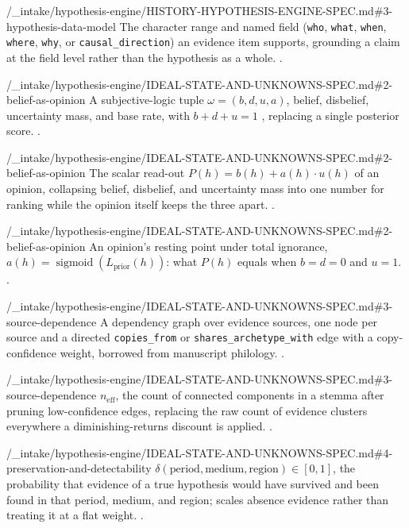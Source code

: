 %
  {\bktrepo/_intake/hypothesis-engine/HISTORY-HYPOTHESIS-ENGINE-SPEC.md\#3-hypothesis-data-model}%
  {The character range and named field (\texttt{who}, \texttt{what},
   \texttt{when}, \texttt{where}, \texttt{why}, or \texttt{causal\_direction})
   an evidence item supports, grounding a claim at the field level rather
   than the hypothesis as a whole. .}

%
  {\bktrepo/_intake/hypothesis-engine/IDEAL-STATE-AND-UNKNOWNS-SPEC.md\#2-belief-as-opinion}%
  {A subjective-logic tuple $\omega = (b, d, u, a)$, belief, disbelief,
   uncertainty mass, and base rate, with $b + d + u = 1$
   \autocite{josang2016subjective}, replacing a single posterior score.
   .}

%
  {\bktrepo/_intake/hypothesis-engine/IDEAL-STATE-AND-UNKNOWNS-SPEC.md\#2-belief-as-opinion}%
  {The scalar read-out $P(h) = b(h) + a(h) \cdot u(h)$ of an opinion,
   collapsing belief, disbelief, and uncertainty mass into one number for
   ranking while the opinion itself keeps the three apart.
   .}

%
  {\bktrepo/_intake/hypothesis-engine/IDEAL-STATE-AND-UNKNOWNS-SPEC.md\#2-belief-as-opinion}%
  {An opinion's resting point under total ignorance, $a(h) =
   \operatorname{sigmoid}(L_{\mathrm{prior}}(h))$: what $P(h)$ equals when
   $b = d = 0$ and $u = 1$. .}

%
  {\bktrepo/_intake/hypothesis-engine/IDEAL-STATE-AND-UNKNOWNS-SPEC.md\#3-source-dependence}%
  {A dependency graph over evidence sources, one node per source and a
   directed \texttt{copies\_from} or \texttt{shares\_archetype\_with} edge
   with a copy-confidence weight, borrowed from manuscript philology.
   .}

%
  {\bktrepo/_intake/hypothesis-engine/IDEAL-STATE-AND-UNKNOWNS-SPEC.md\#3-source-dependence}%
  {$n_{\mathrm{eff}}$, the count of connected components in a stemma after
   pruning low-confidence edges, replacing the raw count of evidence
   clusters everywhere a diminishing-returns discount is applied.
   .}

%
  {\bktrepo/_intake/hypothesis-engine/IDEAL-STATE-AND-UNKNOWNS-SPEC.md\#4-preservation-and-detectability}%
  {$\delta(\mathrm{period}, \mathrm{medium}, \mathrm{region}) \in [0,1]$,
   the probability that evidence of a true hypothesis would have survived
   and been found in that period, medium, and region; scales absence
   evidence rather than treating it at a flat weight. .}

